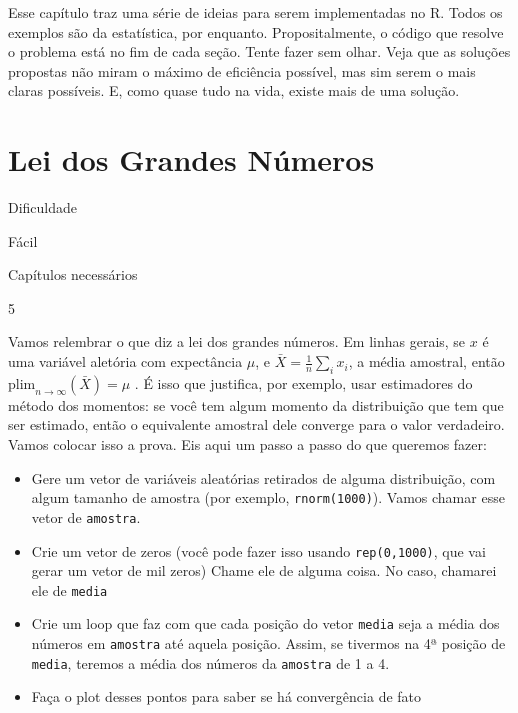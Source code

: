 \documentclass[]{book}
\providecommand{\tightlist}{%
  \setlength{\itemsep}{0pt}\setlength{\parskip}{0pt}}
\begin{document}
Esse capítulo traz uma série de ideias para serem implementadas no R.
Todos os exemplos são da estatística, por enquanto. Propositalmente, o
código que resolve o problema está no fim de cada seção. Tente fazer sem
olhar. Veja que as soluções propostas não miram o máximo de eficiência
possível, mas sim serem o mais claras possíveis. E, como quase tudo na
vida, existe mais de uma solução.

\section{Lei dos Grandes Números}\label{lei-dos-grandes-numeros}

Dificuldade

Fácil

Capítulos necessários

5

Vamos relembrar o que diz a lei dos grandes números. Em linhas gerais,
se \(x\) é uma variável aletória com expectância \(\mu\), e
\(\bar{X} = \frac{1}{n}\sum_i x_i\), a média amostral, então
\(\text{plim}_{n \rightarrow \infty}(\bar{X}) = \mu\) . É isso que
justifica, por exemplo, usar estimadores do método dos momentos: se você
tem algum momento da distribuição que tem que ser estimado, então o
equivalente amostral dele converge para o valor verdadeiro. Vamos
colocar isso a prova. Eis aqui um passo a passo do que queremos fazer:

\begin{itemize}
\tightlist
\item
  Gere um vetor de variáveis aleatórias retirados de alguma
  distribuição, com algum tamanho de amostra (por exemplo,
  \texttt{rnorm(1000)}). Vamos chamar esse vetor de \texttt{amostra}.
\item
  Crie um vetor de zeros (você pode fazer isso usando
  \texttt{rep(0,1000)}, que vai gerar um vetor de mil zeros) Chame ele
  de alguma coisa. No caso, chamarei ele de \texttt{media}
\item
  Crie um loop que faz com que cada posição do vetor \texttt{media} seja
  a média dos números em \texttt{amostra} até aquela posição. Assim, se
  tivermos na 4ª posição de \texttt{media}, teremos a média dos números
  da \texttt{amostra} de 1 a 4.
\item
  Faça o plot desses pontos para saber se há convergência de fato
\end{itemize}
\end{document}
